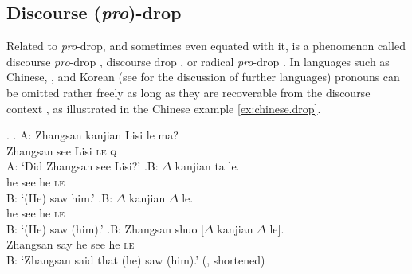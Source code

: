 \subsection{Discourse (\textit{pro})-drop}\label{sec:discourse.drop} 
Related to \textit{pro}-drop,  and sometimes even equated with it, is a phenomenon called discourse \textit{pro}-drop \citep{tomioka2003, barbosa2011}, discourse drop \citep{sigurdsson2011}, or radical \textit{pro}-drop \citep{neeleman.szendroi2005,neeleman.szendroi2007}.
In languages such as Chinese,  , and Korean  (see \cite{neeleman.szendroi2007} for the discussion of further languages) pronouns can be omitted rather freely as long as they are recoverable  from the discourse context \citep{huang1984, neeleman.szendroi2007}, as illustrated in the Chinese  example \ref{ex:chinese.drop}.

\ex.\label{ex:chinese.drop}
\ag.  A: Zhangsan kanjian Lisi le ma?\\
{} Zhangsan see Lisi {\textsc{le}\footnotemark} \textsc{q}\\
A: `Did Zhangsan see Lisi?'
\bg.\label{ex:chinese.drop.1c}B: $\Delta$ kanjian ta le.\\
{} he see he \textsc{le}\\
B: `(He) saw him.'
\cg.\label{ex:chinese.drop.2c}B: $\Delta$ kanjian $\Delta$ le.\\
{} he see he \textsc{le}\\
B: `(He) saw (him).'
\dg.\label{ex:chinese.drop.emb}B: Zhangsan shuo [$\Delta$ kanjian $\Delta$ le].\\
{} Zhangsan say he see he \textsc{le}\\
B: `Zhangsan said that (he) saw (him).' (\cite[533]{huang1984}, shortened)

